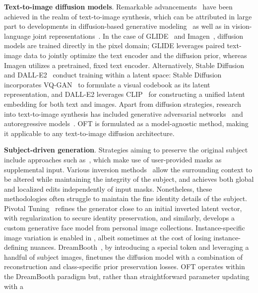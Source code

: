 \textbf{Text-to-image diffusion models}. Remarkable advancements~\cite{saharia2022photorealistic,ramesh2022hierarchical,rombach2022high,gu2022vector,nichol2022glide} have been achieved in the realm of text-to-image synthesis, which can be attributed in large part to developments in diffusion-based generative modeling~\cite{ho2020denoising,song2021score,song2021denoising,dhariwal2021diffusion} as well as in vision-language joint representations~\cite{su2020vlbert,lu2019vilbert,radford2021learning,wang2021simvlm,li2022blip,li2023blip,alayrac2022flamingo,schuhmann2022laion}. In the case of GLIDE~\cite{nichol2022glide} and Imagen~\cite{saharia2022photorealistic}, diffusion models are trained directly in the pixel domain; GLIDE leverages paired text-image data to jointly optimize the text encoder and the diffusion prior, whereas Imagen utilizes a pretrained, fixed text encoder. Alternatively, Stable Diffusion~\cite{rombach2022high} and DALL-E2~\cite{ramesh2022hierarchical} conduct training within a latent space: Stable Diffusion incorporates VQ-GAN~\cite{esser2021taming} to formulate a visual codebook as its latent representation, and DALL-E2 leverages CLIP~\cite{radford2021learning} for constructing a unified latent embedding for both text and images. Apart from diffusion strategies, research into text-to-image synthesis has included generative adversarial networks~\cite{reed2016generative,zhang2017stackgan,xu2018attngan,li2019controllable} and autoregressive models~\cite{ramesh2021zero,ding2021cogview,wu2022nuwa,yuscaling}. OFT is formulated as a model-agnostic method, making it applicable to any text-to-image diffusion architecture.

\textbf{Subject-driven generation}. Strategies aiming to preserve the original subject include approaches such as~\cite{avrahami2022blended,nichol2022glide}, which make use of user-provided masks as supplemental input. Various inversion methods~\cite{choi2021ilvr,dhariwal2021diffusion,ramesh2022hierarchical,gal2022image} allow the surrounding context to be altered while maintaining the integrity of the subject, and \cite{hertz2022prompt} achieves both global and localized edits independently of input masks. Nonetheless, these methodologies often struggle to maintain the fine identity details of the subject. Pivotal Tuning~\cite{roich2022pivotal} refines the generator close to an initial inverted latent vector, with regularization to secure identity preservation, and similarly, \cite{nitzan2022mystyle} develops a custom generative face model from personal image collections. Instance-specific image variation is enabled in \cite{casanova2021instance}, albeit sometimes at the cost of losing instance-defining nuances. DreamBooth~\cite{ruiz2023dreambooth}, by introducing a special token and leveraging a handful of subject images, finetunes the diffusion model with a combination of reconstruction and class-specific prior preservation losses. OFT operates within the DreamBooth paradigm but, rather than straightforward parameter updating with a

